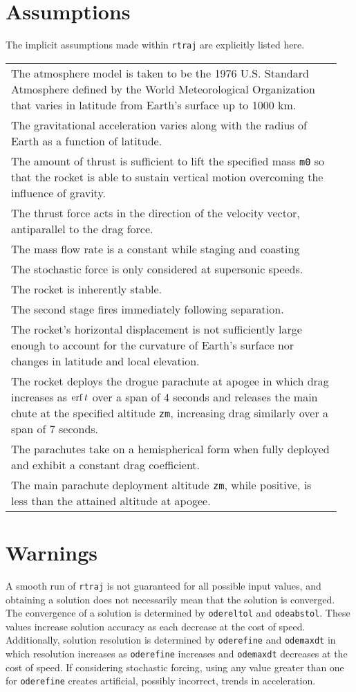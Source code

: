 \documentclass[11pt]{thesis}
\numberwithin{equation}{section}
\begin{document}
\section{Assumptions}
The implicit assumptions made within \texttt{rtraj} are explicitly listed here.
\begin{table}[H]
\renewcommand{\arraystretch}{1.5}
\begin{longtable}[l]{p{0.95\linewidth}}
The atmosphere model is taken to be the 1976 U.S. Standard Atmosphere defined by the World Meteorological Organization that varies in latitude from Earth's surface up to 1000 km. \\
The gravitational acceleration varies along with the radius of Earth as a function of latitude. \\
The amount of thrust is sufficient to lift the specified mass \texttt{m0} so that the rocket is able to sustain vertical motion overcoming the influence of gravity. \\
The thrust force acts in the direction of the velocity vector, antiparallel to the drag force. \\
The mass flow rate is a constant while staging and coasting \\
The stochastic force is only considered at supersonic speeds. \\
The rocket is inherently stable. \\
The second stage fires immediately following separation. \\
The rocket's horizontal displacement is not sufficiently large enough to account for the curvature of Earth's surface nor changes in latitude and local elevation. \\
The rocket deploys the drogue parachute at apogee in which drag increases as $\erf t$ over a span of 4 seconds and releases the main chute at the specified altitude \texttt{zm}, increasing drag similarly over a span of 7 seconds. \\
The parachutes take on a hemispherical form when fully deployed and exhibit a constant drag coefficient. \\
The main parachute deployment altitude \texttt{zm}, while positive, is less than the attained altitude at apogee.
\end{longtable}
\end{table}

\section{Warnings}
A smooth run of \texttt{rtraj} is not guaranteed for all possible input values, and obtaining a solution does not necessarily mean that the solution is converged. The convergence of a solution is determined by \texttt{odereltol} and \texttt{odeabstol}. These values increase solution accuracy as each decrease at the cost of speed. Additionally, solution resolution is determined by \texttt{oderefine} and \texttt{odemaxdt} in which resolution increases as \texttt{oderefine} increases and \texttt{odemaxdt} decreases at the cost of speed. If considering stochastic forcing, using any value greater than one for \texttt{oderefine} creates artificial, possibly incorrect, trends in acceleration.
\end{document}
